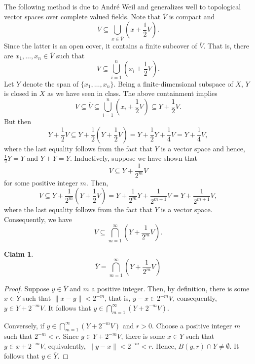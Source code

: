 \documentclass[10pt]{amsart}
\theoremstyle{thmstyle}
\newtheorem*{claim}{Claim}
\theoremstyle{defstyle}
\begin{document}
The following method is due to Andr\'e Weil and generalizes well to topological vector spaces over complete valued fields. Note that $\overline V$ is compact and 
\begin{equation*}
	\overline V \subseteq \bigcup_{x\in\overline V}\left(x + \frac{1}{2}V\right).
\end{equation*}
Since the latter is an open cover, it contains a finite subcover of $\overline V$. That is, there are $x_1,\dots,x_n\in\overline V$ such that 
\begin{equation*}
	\overline V\subseteq\bigcup_{i = 1}^n \left(x_i + \frac{1}{2}V\right).
\end{equation*}
Let $Y$ denote the span of $\{x_1,\dots,x_n\}$. Being a finite-dimensional subspace of $X$, $Y$ is closed in $X$ as we have seen in class. The above containment implies 
\begin{equation*}
	V\subseteq\overline V\subseteq\bigcup_{i = 1}^n\left(x_i + \frac{1}{2}V\right)\subseteq Y + \frac{1}{2}V.
\end{equation*}
But then 
\begin{equation*}
	Y + \frac{1}{2}V\subseteq Y + \frac{1}{2}\left(Y + \frac{1}{2}V\right) = Y + \frac{1}{2}Y + \frac{1}{4}V = Y + \frac{1}{4}V,
\end{equation*}
where the last equality follows from the fact that $Y$ is a vector space and hence, $\frac{1}{2}Y = Y$ and $Y + Y = Y$. Inductively, suppose we have shown that 
\begin{equation*}
	V\subseteq Y + \frac{1}{2^m}V
\end{equation*}
for some positive integer $m$. Then, 
\begin{equation*}
	V \subseteq Y + \frac{1}{2^m}\left(Y + \frac{1}{2}V\right) = Y + \frac{1}{2^m}Y + \frac{1}{2^{m + 1}}V = Y + \frac{1}{2^{m + 1}}V,
\end{equation*}
where the last equality follows from the fact that $Y$ is a vector space. Consequently, we have 
\begin{equation*}
	V\subseteq\bigcap_{m = 1}^\infty\left(Y + \frac{1}{2^m}V\right).
\end{equation*}

\begin{claim}
	\begin{equation*}
		\overline Y = \bigcap_{m = 1}^\infty\left(Y + \frac{1}{2^m}V\right)
	\end{equation*}
\end{claim}
\begin{proof}
	Suppose $y\in\overline Y$ and $m$ a positive integer. Then, by definition, there is some $x\in Y$ such that $\|x - y\| < 2^{-m}$, that is, $y - x\in 2^{-m}V$, consequently, $y\in Y + 2^{-m}V$. It follows that $y\in\bigcap_{m = 1}^\infty (Y + 2^{-m}V)$.

	Conversely, if $y\in\bigcap_{m = 1}^\infty(Y + 2^{-m}V)$ and $r > 0$. Choose a positive integer $m$ such that $2^{-m} < r$. Since $y\in Y + 2^{-m}V$, there is some $x\in Y$ such that $y\in x + 2^{-m}V$, equivalently, $\|y - x\| < 2^{-m} < r$. Hence, $B(y, r)\cap Y\ne\emptyset$. It follows that $y\in\overline Y$.
\end{proof}
\end{document}
